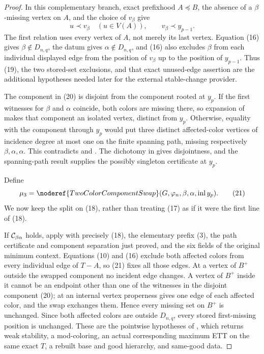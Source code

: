 \begin{proof}
In this complementary branch, exact prefixhood \(A\preccurlyeq B\),
the absence of a \(\beta\)-missing vertex on \(A\), and the choice of
\(v_\beta\) give
\[
  u\prec v_\beta\quad(u\in V(A)),\qquad
  v_\beta\prec y_{p-1}.                                    \tag{19}
\]
The first relation uses every vertex of \(A\), not merely its last
vertex.  Equation (16) gives
\(\beta\notin D_{n,q}\), the datum gives
\(\alpha\notin D_{n,q}\), and (16) also excludes \(\beta\) from each
individual displayed edge from the position of \(v_\beta\) up to the
position of \(y_{p-1}\).  Thus (19), the two stored-set exclusions, and
that exact unused-edge assertion are the additional hypotheses needed
later for the external stable-change provider.

The component in (20) is disjoint from the component rooted at \(y_p\).
If the first witnesses for \(\beta\) and \(\alpha\) coincide, both
colors are missing there, so expansion of
 makes that component an isolated
vertex, distinct from \(y_p\).  Otherwise, equality with the component
through \(y_p\) would put three distinct affected-color vertices of
incidence degree at most one on the finite spanning path, missing
respectively \(\beta,\alpha,\alpha\).  This contradicts
 and
.  The dichotomy in
 gives disjointness, and the
spanning-path result supplies the possibly singleton
 certificate at \(y_p\).

Define
\[
 \mu_3=\noderef{TwoColorComponentSwap}
       (G,\varphi_n,\beta,\alpha,\operatorname{inl}y_p).     \tag{21}
\]
We now keep the split on (18), rather than treating (17) as if it were
the first line of (18).

If \({\cal C}_{\beta\alpha}\) holds, apply
 with precisely (18), the elementary
prefix (3), the path certificate and component separation just proved,
and the six fields of the original minimum context.  Equations (10) and
(16) exclude both affected colors from every individual edge of
\(T-A\), so (21) fixes all those edges.  At a vertex of \(B^+\) outside
the swapped component no incident edge changes.  A vertex of \(B^+\)
inside it cannot be an endpoint other than one of the witnesses in the
disjoint component (20); at an internal vertex properness gives one edge
of each affected color, and the swap exchanges them.  Hence every
missing set on \(B^+\) is unchanged.  Since both affected colors are
outside \(D_{n,q}\), every stored first-missing position is unchanged.
These are the pointwise hypotheses of
, which returns weak stability,
a mod-coloring, an actual corresponding maximum ETT on the same exact
\(T\), a rebuilt base and good hierarchy, and same-good data.


\end{proof}
